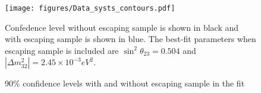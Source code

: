 \begin{figure}[!th]
\centering
\texttt{[image: figures/Data\_systs\_contours.pdf]}
\caption{90\% confidence levels with and without escaping sample in the fit}
{Confedence level without escaping sample is shown in black and with escaping sample is shown in blue. The best-fit 
parameters when escaping sample is included are $\sin^2\theta_{23} = 0.504$ and $|\Delta m^2_{32}| = 2.45\times 10^{-3} eV^2$.}
\label{fig:contpurd_cont_uncont}
\end{figure}

